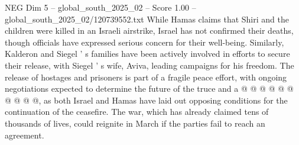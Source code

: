 \begin{textsample}{NEG Dim 5 – global\_south\_2025\_02 – Score 1.00 – global\_south\_2025\_02/120739552.txt}
While Hamas claims that Shiri and the children were killed in an Israeli airstrike, Israel has not confirmed their deaths, though officials have expressed serious concern for their well-being.
Similarly, Kalderon and Siegel ' s families have been actively involved in efforts to secure their release, with Siegel ' s wife, Aviva, leading campaigns for his freedom.
The release of hostages and prisoners is part of a fragile peace effort, with ongoing negotiations expected to determine the future of the truce and a @ @ @ @ @ @ @ @ @ @, as both Israel and Hamas have laid out opposing conditions for the continuation of the ceasefire.
The war, which has already claimed tens of thousands of lives, could reignite in March if the parties fail to reach an agreement.

\end{textsample}
